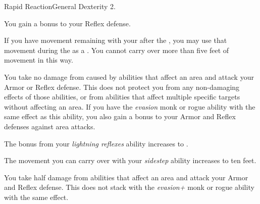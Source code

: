     \begin{feat}{Rapid Reaction}{General}
        \featpre Dexterity 2.

         You gain a  bonus to your Reflex defense.

         If you have movement remaining with your  after the , you may use that movement during the  as a .
        You cannot carry over more than five feet of movement in this way.

         You take no damage from  caused by abilities that affect an area and attack your Armor or Reflex defense.
        This does not protect you from any non-damaging effects of those abilities, or from abilities that affect multiple specific targets without affecting an area.
        If you have the \textit{evasion} monk or rogue ability with the same effect as this ability, you also gain a  bonus to your Armor and Reflex defenses against area attacks.

         The bonus from your \textit{lightning reflexes} ability increases to .

         The movement you can carry over with your \textit{sidestep} ability increases to ten feet.

         You take half damage from abilities that affect an area and attack your Armor and Reflex defense.
        This does not stack with the \textit{evasion+} monk or rogue ability with the same effect.
    \end{feat}

